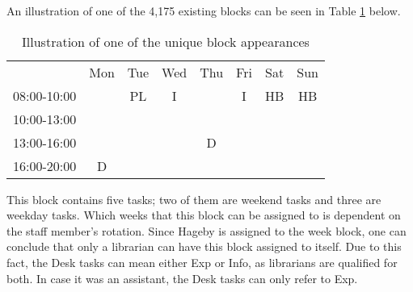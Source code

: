 An illustration of one of the 4,175 existing blocks can be seen in Table \ref{block_example} below.
\begin{table}[!h]
\centering
\caption{Illustration of one of the unique block appearances}
\label{block_example}
\begin{tabular}{cccccccc}
                           & Mon                                            & Tue                                             & Wed                    & Thu                                            & Fri                    & Sat                                             & Sun                                             \\ \cline{2-8} 
\multicolumn{1}{c|}{08:00-10:00}  & \multicolumn{1}{c|}{}                          & \multicolumn{1}{c|}{\cellcolor[HTML]{FCFF2F}PL} & \multicolumn{1}{c|}{I} & \multicolumn{1}{c|}{}                          & \multicolumn{1}{c|}{I} & \multicolumn{1}{c|}{\cellcolor[HTML]{FCFF2F}HB} & \multicolumn{1}{c|}{\cellcolor[HTML]{FCFF2F}HB} \\ \cline{2-8} 
\multicolumn{1}{c|}{10:00-13:00} & \multicolumn{1}{c|}{}                          & \multicolumn{1}{c|}{\cellcolor[HTML]{FCFF2F}}   & \multicolumn{1}{c|}{}  & \multicolumn{1}{c|}{}                          & \multicolumn{1}{c|}{}  &                                                 &                                                 \\ \cline{2-6}
\multicolumn{1}{c|}{13:00-16:00} & \multicolumn{1}{c|}{}                          & \multicolumn{1}{c|}{\cellcolor[HTML]{FCFF2F}}   & \multicolumn{1}{c|}{}  & \multicolumn{1}{c|}{\cellcolor[HTML]{FCFF2F}D} & \multicolumn{1}{c|}{}  &                                                 &                                                 \\ \cline{2-6}
\multicolumn{1}{c|}{16:00-20:00} & \multicolumn{1}{c|}{\cellcolor[HTML]{FCFF2F}D} & \multicolumn{1}{c|}{}                           & \multicolumn{1}{c|}{}  & \multicolumn{1}{c|}{}                          & \multicolumn{1}{c|}{}  &                                                 &                                                 \\ \cline{2-6}
\end{tabular}
\end{table}

This block contains five tasks; two of them are weekend tasks and three are weekday tasks. Which weeks that this block can be assigned to is dependent on the staff member's rotation. Since Hageby is assigned to the week block, one can conclude that only a librarian can have this block assigned to itself. Due to this fact, the Desk tasks can mean either Exp or Info, as librarians are qualified for both. In case it was an assistant, the Desk tasks can only refer to Exp.


